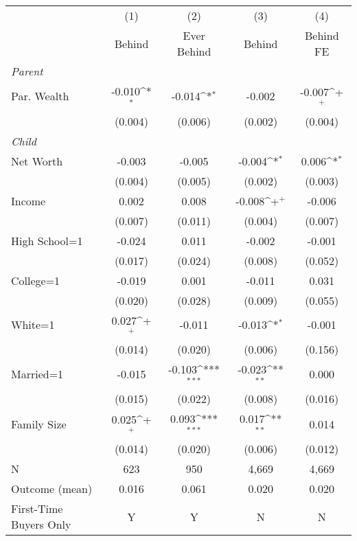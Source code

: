 {
\def\sym#1{\ifmmode^{#1}\else\(^{#1}\)\fi}
\begin{tabular}{l*{4}{c}}
\toprule
                &\multicolumn{1}{c}{(1)}&\multicolumn{1}{c}{(2)}&\multicolumn{1}{c}{(3)}&\multicolumn{1}{c}{(4)}\\
                &\multicolumn{1}{c}{Behind}&\multicolumn{1}{c}{Ever Behind}&\multicolumn{1}{c}{Behind }&\multicolumn{1}{c}{Behind FE}\\
\midrule
\textit{Parent} &                  &                  &                  &                  \\
\;Par. Wealth   &   -0.010\sym{*}  &   -0.014\sym{*}  &   -0.002         &   -0.007\sym{+}  \\
                &  (0.004)         &  (0.006)         &  (0.002)         &  (0.004)         \\
\textit{Child}  &                  &                  &                  &                  \\
\;Net Worth     &   -0.003         &   -0.005         &   -0.004\sym{*}  &    0.006\sym{*}  \\
                &  (0.004)         &  (0.005)         &  (0.002)         &  (0.003)         \\
\;Income        &    0.002         &    0.008         &   -0.008\sym{+}  &   -0.006         \\
                &  (0.007)         &  (0.011)         &  (0.004)         &  (0.007)         \\
\;High School=1 &   -0.024         &    0.011         &   -0.002         &   -0.001         \\
                &  (0.017)         &  (0.024)         &  (0.008)         &  (0.052)         \\
\;College=1     &   -0.019         &    0.001         &   -0.011         &    0.031         \\
                &  (0.020)         &  (0.028)         &  (0.009)         &  (0.055)         \\
\;White=1       &    0.027\sym{+}  &   -0.011         &   -0.013\sym{*}  &   -0.001         \\
                &  (0.014)         &  (0.020)         &  (0.006)         &  (0.156)         \\
\;Married=1     &   -0.015         &   -0.103\sym{***}&   -0.023\sym{**} &    0.000         \\
                &  (0.015)         &  (0.022)         &  (0.008)         &  (0.016)         \\
\;Family Size   &    0.025\sym{+}  &    0.093\sym{***}&    0.017\sym{**} &    0.014         \\
                &  (0.014)         &  (0.020)         &  (0.006)         &  (0.012)         \\
\midrule
N               &      623         &      950         &    4,669         &    4,669         \\
Outcome (mean)  &    0.016         &    0.061         &    0.020         &    0.020         \\
First-Time Buyers Only&        Y         &        Y         &        N         &        N         \\
\bottomrule
\end{tabular}
}
